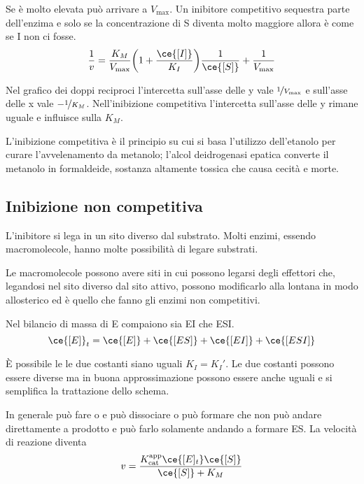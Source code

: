 Se \ce{[S]} è molto elevata può arrivare a $V_{\text{max}}$.
Un inibitore competitivo sequestra parte dell’enzima e solo se la concentrazione
di S diventa molto maggiore allora è come se I non ci fosse.
\[
\frac{1}{v} = \frac{K_M}{V_{\text{max}}} \biggl(1 + \frac{\ce{[I]}}{K_I} \biggr) \frac{1}{\ce{[S]}} + \frac{1}{V_{\text{max}}}
\]

Nel grafico dei doppi reciproci l’intercetta sull’asse delle y vale $\nicefrac{1}{V_{\text{max}}}$ e sull’asse
delle x vale $-\nicefrac{1}{K_M}$. Nell’inibizione competitiva l’intercetta sull’asse delle y rimane uguale
e influisce sulla $K_M$.


L'inibizione competitiva è il principio su cui si basa l'utilizzo dell'etanolo per curare l'avvelenamento da metanolo; l'alcol deidrogenasi epatica converte il metanolo in formaldeide, sostanza altamente tossica che causa cecità e morte.

\clearpage

\subsection{Inibizione non competitiva}

L'inibitore si lega in un sito diverso dal substrato.
Molti enzimi, essendo macromolecole, hanno molte possibilità di legare substrati.

Le macromolecole possono avere siti in cui possono legarsi degli effettori che, legandosi nel sito diverso dal sito attivo, possono modificarlo alla lontana in modo
allosterico ed è quello che fanno gli enzimi non competitivi.


Nel bilancio di massa di E compaiono sia EI che ESI.{}
\[
\ce{[E]}_t = \ce{[E]} + \ce{[ES]} + \ce{[EI]} + \ce{[ESI]}
\]

È possibile le le due costanti siano uguali $K_I = K_I'$.
Le due costanti possono essere diverse ma in buona approssimazione possono essere anche uguali e si semplifica la trattazione dello schema.

In generale  può fare  o  e  può dissociare o può formare  che non può
andare direttamente a prodotto e può farlo solamente andando a formare ES.{}
La velocità di reazione diventa
\[
v = \frac{K_{\text{cat}}^{\text{app}} \ce{[E]_t} \ce{[S]}}{\ce{[S]} + K_M} 
\]

